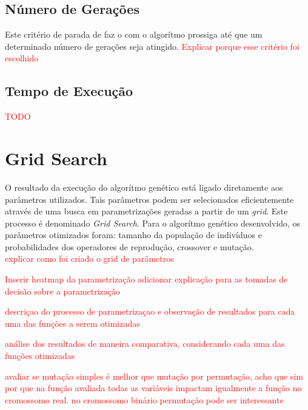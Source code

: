 \documentclass[conference]{IEEEtran}
\newcommand\myworries[1]{\textcolor{red}{#1}}
\begin{document}
\subsection{Número de Gerações}
Este critério de parada de faz o com o algorítmo prossiga até que um determinado
número de gerações seja atingido. 
\myworries{Explicar porque esse critério foi escolhido}

\subsection{Tempo de Execução}
\myworries{TODO}

\section{Grid Search}
O resultado da execução do algorítmo genético está ligado diretamente aos
parâmetros utilizados. Tais parâmetros podem ser selecionados eficientemente
através de uma busca em parametrizações geradas a partir de um \textit{grid}.
Este processo é denominado \textit{Grid Search}.
Para o algorítmo genético desenvolvido, os parâmetros otimizados foram: tamanho 
da população de indivíduos e probabilidades dos operadores de reprodução, 
crossover e mutação.\\
\myworries{explicar como foi criado o grid de parâmetros}

\myworries{Inserir heatmap da parametrização}
\myworries{adicionar explicação para as tomadas de decisão sobre a parametrização}


\myworries{descriçao do processo de parametrizaçao e observação de resultados para cada uma das funções a
serem otimizadas}

\myworries{análise dos resultados de maneira comparativa, considerando cada uma das funções otimizadas}

\myworries{avaliar se mutação simples é melhor que mutação por permutação, acho que sim por que na função avaliada todas as variáveis impactam igualmente a função no cromossomo real. no cromossomo binário permutação pode ser interessante}

%
%
\end{document}
